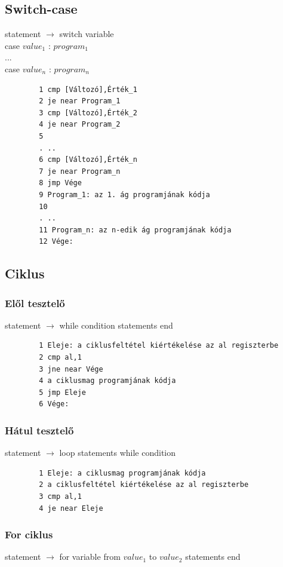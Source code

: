 \documentclass[margin=0px]{article}
\begin{document}
\subsection{Switch-case}
	statement $ \rightarrow $ switch variable
	\\case $ value_1 $ : $ program_1 $
	\\...
	\\case $ value_n $ : $ program_n $
	
	\begin{verbatim}
		1 cmp [Változó],Érték_1
		2 je near Program_1
		3 cmp [Változó],Érték_2
		4 je near Program_2
		5
		. ..
		6 cmp [Változó],Érték_n
		7 je near Program_n
		8 jmp Vége
		9 Program_1: az 1. ág programjának kódja
		10
		. ..
		11 Program_n: az n-edik ág programjának kódja
		12 Vége:
	\end{verbatim}

\subsection{Ciklus}
\subsubsection{Elől tesztelő}	
	statement $ \rightarrow $ while condition statements end
	
	\begin{verbatim}
		1 Eleje: a ciklusfeltétel kiértékelése az al regiszterbe
		2 cmp al,1
		3 jne near Vége
		4 a ciklusmag programjának kódja
		5 jmp Eleje
		6 Vége:
	\end{verbatim}
	
	
\subsubsection{Hátul tesztelő}	
	statement $ \rightarrow $ loop statements while condition


	\begin{verbatim}
		1 Eleje: a ciklusmag programjának kódja
		2 a ciklusfeltétel kiértékelése az al regiszterbe
		3 cmp al,1
		4 je near Eleje
	\end{verbatim}
	
\subsubsection{For ciklus}	

	statement $ \rightarrow $ for variable from $ value_1 $ to $ value_2 $ statements end
	
\end{document}
